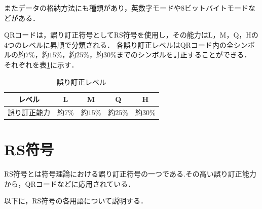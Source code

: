 \documentclass{thesis}
\begin{document}
またデータの格納方法にも種類があり，英数字モードや8ビットバイトモードなどがある．

QRコードは，誤り訂正符号としてRS符号を使用し，その能力はL，M，Q，Hの$4$つのレベルに昇順で分類される．
各誤り訂正レベルはQRコード内の全シンボルの約$7\%$，約$15\%$，約$25\%$，約$30\%$までのシンボルを訂正することができる．
それぞれを表\ref{Correction_ability}に示す．

\begin{table}[htbp]
\begin{center}
  \caption{誤り訂正レベル \label{Correction_ability}}
    \begin{tabular}{|c|c|c|c|c|} \hline
     レベル&L&M&Q&H\\ \hline\hline
     誤り訂正能力&約$7\%$&約$15\%$&約$25\%$&約$30\%$ \\ \hline
    \end{tabular}{}
\end{center}
\end{table}


\section{RS符号}
RS符号とは符号理論における誤り訂正符号の一つである.その高い誤り訂正能力から，QRコードなどに応用されている．


以下に，RS符号の各用語について説明する．
\end{document}
